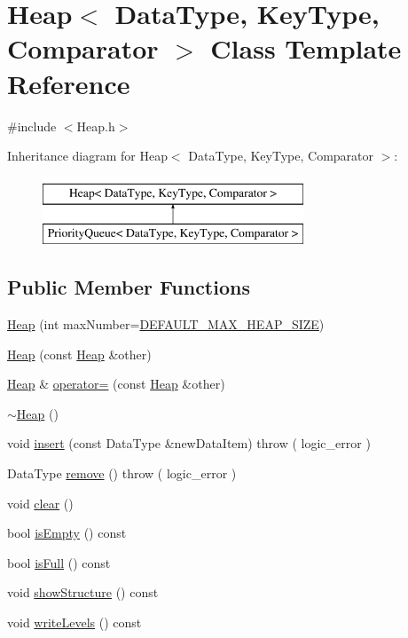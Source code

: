 \hypertarget{class_heap}{\section{\-Heap$<$ \-Data\-Type, \-Key\-Type, \-Comparator $>$ \-Class \-Template \-Reference}
\label{class_heap}
}


{\ttfamily \#include $<$\-Heap.\-h$>$}

\-Inheritance diagram for \-Heap$<$ \-Data\-Type, \-Key\-Type, \-Comparator $>$\-:\begin{figure}[H]
\begin{center}
\leavevmode
\includegraphics[height=2.000000cm]{class_heap}
\end{center}
\end{figure}
\subsection*{\-Public \-Member \-Functions}
\begin{DoxyCompactItemize}
\item 
\hyperlink{class_heap_ae17e34e3c86d88263a8fdf80b9ba78fc}{\-Heap} (int max\-Number=\hyperlink{class_heap_a967c19732a20a72e8e824402ad6763c8}{\-D\-E\-F\-A\-U\-L\-T\-\_\-\-M\-A\-X\-\_\-\-H\-E\-A\-P\-\_\-\-S\-I\-Z\-E})
\item 
\hyperlink{class_heap_a97e3b462be1c6af31d7519546bba8907}{\-Heap} (const \hyperlink{class_heap}{\-Heap} \&other)
\item 
\hyperlink{class_heap}{\-Heap} \& \hyperlink{class_heap_a5ed119341c39bcea1437321d4247dd40}{operator=} (const \hyperlink{class_heap}{\-Heap} \&other)
\item 
\hyperlink{class_heap_a555ade7891007de959bef0ee53e28767}{$\sim$\-Heap} ()
\item 
void \hyperlink{class_heap_aa68cf80454ab1b246fa723612805a91e}{insert} (const \-Data\-Type \&new\-Data\-Item)  throw ( logic\-\_\-error )
\item 
\-Data\-Type \hyperlink{class_heap_a4a18bfdacd897c45fc3da13f22b8930d}{remove} ()  throw ( logic\-\_\-error )
\item 
void \hyperlink{class_heap_a19a78c8eae2cf7c8253e34e54d86ed73}{clear} ()
\item 
bool \hyperlink{class_heap_ab8fa26d416ac0e27dfcbf18c54f8f73f}{is\-Empty} () const 
\item 
bool \hyperlink{class_heap_ac9111b884c74a376240e0155a788756e}{is\-Full} () const 
\item 
void \hyperlink{class_heap_a3ae1e1f27a145749c8b9f2da777cb8bc}{show\-Structure} () const 
\item 
void \hyperlink{class_heap_a4bdb1772ea92899de245d6cbd217d085}{write\-Levels} () const 
\end{DoxyCompactItemize}
